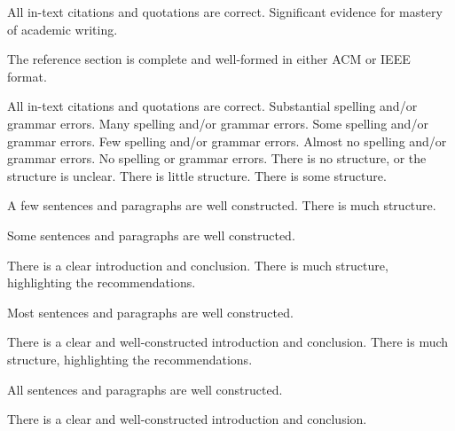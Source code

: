 \documentclass{../fal_assignment}
\begin{document}
\begin{markingrubric}
        \par 		All in-text citations and quotations are correct.
        \grade 		Significant evidence for mastery of academic writing.
        \par 		The reference section is complete and well-formed in either ACM or IEEE format.
        \par 		All in-text citations and quotations are correct.
%
        \grade\fail 	Substantial spelling and/or grammar errors.
        \grade 		Many spelling and/or grammar errors.
        \grade 		Some spelling and/or grammar errors.  
        \grade 		Few spelling and/or grammar errors.
        \grade 		Almost no spelling and/or grammar errors.
        \grade 		No spelling or grammar errors.
%
        \grade\fail 	There is no structure, or the structure is unclear.
        \grade 		There is little structure.
        \grade 		There is some structure.
        \par 		A few sentences and paragraphs are well constructed.
        \grade 		There is much structure.
        \par 		Some sentences and paragraphs are well constructed.
        \par 		There is a clear introduction and conclusion.
        \grade 		There is much structure, highlighting the recommendations.
        \par 		Most sentences and paragraphs are well constructed.
        \par 		There is a clear and well-constructed introduction and conclusion.
        \grade 		There is much structure, highlighting the recommendations.
        \par 		All sentences and paragraphs are well constructed.
        \par 		There is a clear and well-constructed introduction and conclusion.
\end{markingrubric}
\end{document}

